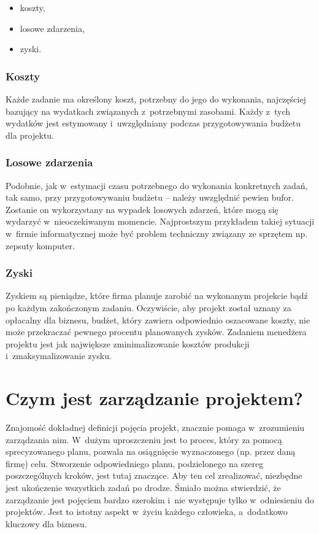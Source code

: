 \documentclass[oneside,polski,logo]{amuthesis}
\begin{document}
\begin{itemize}
	\item koszty,
	\item losowe zdarzenia,
	\item zyski.
\end{itemize}

\subsubsection {Koszty}
Każde zadanie ma określony koszt, potrzebny do jego do wykonania, najczęściej bazujący na wydatkach związanych z~potrzebnymi zasobami. Każdy z~tych wydatków jest estymowany i~uwzględniany podczas przygotowywania budżetu dla projektu.

\subsubsection {Losowe zdarzenia}
Podobnie, jak w~estymacji czasu potrzebnego do wykonania konkretnych zadań, tak samo, przy przygotowywaniu budżetu – należy uwzględnić pewien bufor. Zostanie on wykorzystany na wypadek losowych zdarzeń, które mogą się wydarzyć w~nieoczekiwanym momencie. Najprostszym przykładem takiej sytuacji w~firmie informatycznej może być problem techniczny związany ze sprzętem np. zepsuty komputer.

\subsubsection {Zyski}
Zyskiem są pieniądze, które firma planuje zarobić na wykonanym projekcie bądź po każdym zakończonym zadaniu. Oczywiście, aby projekt został uznany za opłacalny dla biznesu, budżet, który zawiera odpowiednio oszacowane koszty, nie może przekraczać pewnego procentu planowanych zysków. Zadaniem menedżera projektu jest jak największe zminimalizowanie kosztów produkcji i~zmaksymalizowanie zysku.

\section {Czym jest zarządzanie projektem?}
Znajomość dokładnej definicji pojęcia projekt, znacznie pomaga w~zrozumieniu zarządzania nim. W~dużym uproszczeniu jest to proces, który za pomocą sprecyzowanego planu, pozwala na osiągnięcie wyznaczonego (np. przez daną firmę) celu. Stworzenie odpowiedniego planu, podzielonego na szereg poszczególnych kroków, jest tutaj znaczące. Aby ten cel zrealizować, niezbędne jest ukończenie wszystkich zadań po drodze. Śmiało można stwierdzić, że zarządzanie jest pojęciem bardzo szerokim i~nie występuje tylko w~odniesieniu do projektów. Jest to istotny aspekt w~życiu każdego człowieka, a~dodatkowo kluczowy dla biznesu. \cite{zarzadzanie7}
 
\end{document}
